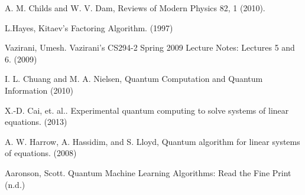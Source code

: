 \documentclass[11pt]{journal}
\begin{document}
\begin{thebibliography}{1} %

     A. M. Childs and W. V. Dam, Reviews of Modern Physics 82, 1 (2010).

  L.Hayes, Kitaev's Factoring Algorithm. (1997)
  
  Vazirani, Umesh. Vazirani’s CS294-2 Spring 2009 Lecture Notes: Lectures 5 and 6. (2009)
  
  I. L. Chuang and M. A. Nielsen, Quantum Computation and Quantum Information (2010)
  
  X.-D. Cai, et. al.. Experimental quantum computing to solve systems of linear equations. (2013)
  
  A. W. Harrow, A. Hassidim, and S. Lloyd, Quantum algorithm for linear systems of equations. (2008)
  
  Aaronson, Scott. Quantum Machine Learning Algorithms: Read the Fine Print (n.d.)
  
 \end{thebibliography}
\end{document}

